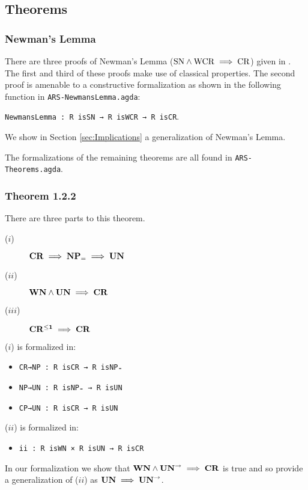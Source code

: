 \subsection{Theorems}
\subsubsection{Newman's Lemma}
There are three proofs of Newman's Lemma ($\mathrm{SN} \land \mathrm{WCR} \implies \mathrm{CR}$) given in \terese. 
The first and third of these proofs make use of classical properties. The second proof is amenable to a 
constructive formalization as shown in the following function in \texttt{ARS-NewmansLemma.agda}:

\verb|NewmansLemma : R isSN → R isWCR → R isCR|.


We show in Section \ref{sec:Implications} a generalization of Newman's Lemma. 

The formalizations of the remaining theorems are all found in \texttt{ARS-Theorems.agda}. 
\subsubsection{Theorem 1.2.2}
There are three parts to this theorem. 
\begin{description}
    \item[($i$)] $\mathbf{CR} \implies \mathbf{NP_=} \implies \mathbf{UN}$
    \item[($ii$)] $\mathbf{WN} \land \mathbf{UN} \implies \mathbf{CR}$  
    \item[($iii$)] $\mathbf{CR^{\le 1}} \implies \mathbf{CR}$
\end{description}

($i$) is formalized in:
\begin{itemize}
    \item \verb|CR→NP : R isCR → R isNP₌|
    \item \verb|NP→UN : R isNP₌ → R isUN|
    \item \verb|CP→UN : R isCR → R isUN|
\end{itemize}

($ii$) is formalized in:
\begin{itemize}
    \item \verb|ii : R isWN × R isUN → R isCR|
\end{itemize}
In our formalization we show that $\mathbf{WN} \land \mathbf{UN}^{\to} \implies \mathbf{CR}$ is true and so provide a generalization of ($ii$) as $\mathbf{UN} \implies \mathbf{UN}^{\to}$. 

